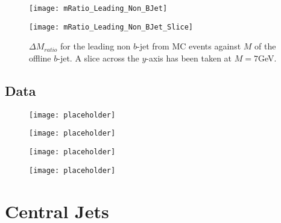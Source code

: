 		\begin{figure}[h]
			\centering
			
			\begin{minipage}[h]{0.33\linewidth}
				\texttt{[image: mRatio\_Leading\_Non\_BJet]}
			\end{minipage}
			\quad
			\begin{minipage}[h]{0.33\linewidth}
				\texttt{[image: mRatio\_Leading\_Non\_BJet\_Slice]}
			\end{minipage}
			\caption{$\Delta M_{ratio}$ for the leading \pt non $b$-jet from MC events against $M$ of the offline $b$-jet. A slice across the $y$-axis has been taken at $M=7$GeV. }
			\label{fig:MC:nonleadingbm}
		\end{figure}
	
	\newpage
	\subsection{Data}
	
		\begin{figure}[h]
			\centering
			
			\begin{minipage}[h]{0.33\linewidth}
				\texttt{[image: placeholder]}
				\caption{}
				\label{fig:D:leadingnonbpt}
			\end{minipage}
			\quad
			\begin{minipage}[h]{0.33\linewidth}
				\texttt{[image: placeholder]}
				\caption{}
				\label{fig:D:leadingnonbeta}
			\end{minipage}
		\end{figure}
		
		\begin{figure}[h]
			\centering
			
			\begin{minipage}[h]{0.33\linewidth}
				\texttt{[image: placeholder]}
				\caption{}
				\label{fig:D:leadingnonbphi}
			\end{minipage}
			\quad
			\begin{minipage}[h]{0.33\linewidth}
				\texttt{[image: placeholder]}
				\caption{}
				\label{fig:D:leadingnonbm}
			\end{minipage}
		\end{figure}
		
		\newpage
\section{Central Jets}

